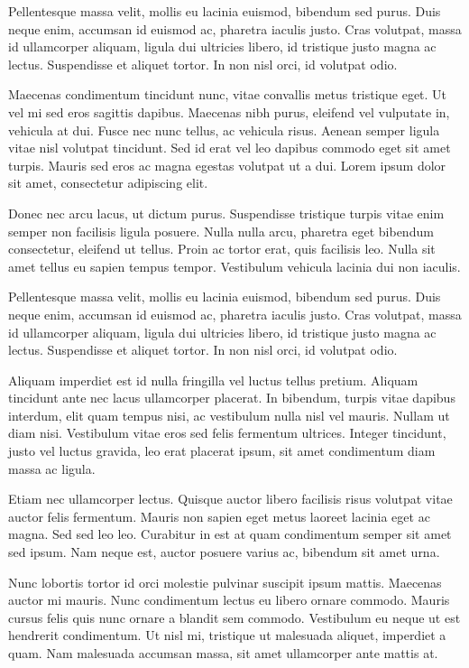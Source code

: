 Pellentesque massa velit, mollis eu lacinia euismod, bibendum sed purus. Duis neque enim, accumsan id euismod ac, pharetra iaculis justo. Cras volutpat, massa id ullamcorper aliquam, ligula dui ultricies libero, id tristique justo magna ac lectus. Suspendisse et aliquet tortor. In non nisl orci, id volutpat odio. 

Maecenas condimentum tincidunt nunc, vitae convallis metus tristique eget. Ut vel mi sed eros sagittis dapibus. Maecenas nibh purus, eleifend vel vulputate in, vehicula at dui. Fusce nec nunc tellus, ac vehicula risus. Aenean semper ligula vitae nisl volutpat tincidunt. Sed id erat vel leo dapibus commodo eget sit amet turpis. Mauris sed eros ac magna egestas volutpat ut a dui. Lorem ipsum dolor sit amet, consectetur adipiscing elit.

Donec nec arcu lacus, ut dictum purus. Suspendisse tristique turpis vitae enim semper non facilisis ligula posuere. Nulla nulla arcu, pharetra eget bibendum consectetur, eleifend ut tellus. Proin ac tortor erat, quis facilisis leo. Nulla sit amet tellus eu sapien tempus tempor. Vestibulum vehicula lacinia dui non iaculis. 

Pellentesque massa velit, mollis eu lacinia euismod, bibendum sed purus. Duis neque enim, accumsan id euismod ac, pharetra iaculis justo. Cras volutpat, massa id ullamcorper aliquam, ligula dui ultricies libero, id tristique justo magna ac lectus. Suspendisse et aliquet tortor. In non nisl orci, id volutpat odio. 

Aliquam imperdiet est id nulla fringilla vel luctus tellus pretium. Aliquam tincidunt ante nec lacus ullamcorper placerat. In bibendum, turpis vitae dapibus interdum, elit quam tempus nisi, ac vestibulum nulla nisl vel mauris. Nullam ut diam nisi. Vestibulum vitae eros sed felis fermentum ultrices. Integer tincidunt, justo vel luctus gravida, leo erat placerat ipsum, sit amet condimentum diam massa ac ligula. 

Etiam nec ullamcorper lectus. Quisque auctor libero facilisis risus volutpat vitae auctor felis fermentum. Mauris non sapien eget metus laoreet lacinia eget ac magna. Sed sed leo leo. Curabitur in est at quam condimentum semper sit amet sed ipsum. Nam neque est, auctor posuere varius ac, bibendum sit amet urna. 

Nunc lobortis tortor id orci molestie pulvinar suscipit ipsum mattis. Maecenas auctor mi mauris. Nunc condimentum lectus eu libero ornare commodo. Mauris cursus felis quis nunc ornare a blandit sem commodo. Vestibulum eu neque ut est hendrerit condimentum. Ut nisl mi, tristique ut malesuada aliquet, imperdiet a quam. Nam malesuada accumsan massa, sit amet ullamcorper ante mattis at.

